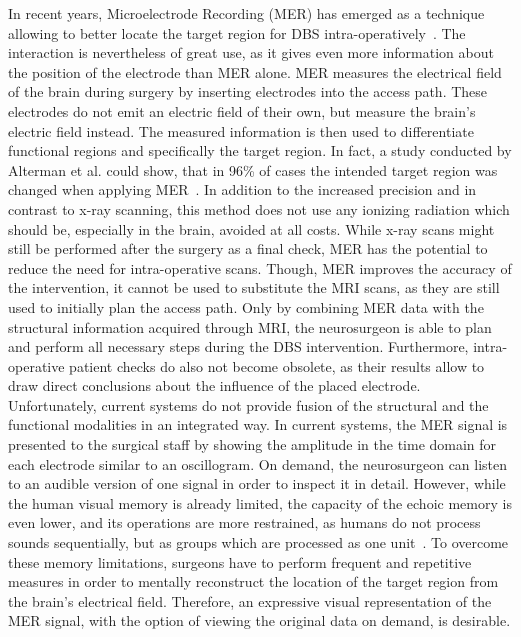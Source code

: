 \documentclass{vgtc}                          %
\begin{document}
In recent years, Microelectrode Recording (MER) has emerged as a technique allowing to better locate the target region for DBS intra-operatively~\cite{Lenz1988}. The interaction is nevertheless of great use, as it gives even more information about the position of the electrode than MER alone. MER measures the electrical field of the brain during surgery by inserting electrodes into the access path. These electrodes do not emit an electric field of their own, but measure the brain's electric field instead. The measured information is then used to differentiate functional regions and specifically the target region. In fact, a study conducted by Alterman et al. could show, that in 96\% of cases the intended target region was changed when applying MER~\cite{Alterman1999}. In addition to the increased precision and in contrast to x-ray scanning, this method does not use any ionizing radiation which should be, especially in the brain, avoided at all costs. While x-ray scans might still be performed after the surgery as a final check, MER has the potential to reduce the need for intra-operative scans. Though, MER improves the accuracy of the intervention, it cannot be used to substitute the MRI scans, as they are still used to initially plan the access path. Only by combining MER data with the structural information acquired through MRI, the neurosurgeon is able to plan and perform all necessary steps during the DBS intervention. Furthermore, intra-operative patient checks do also not become obsolete, as their results allow to draw direct conclusions about the influence of the placed electrode. Unfortunately, current systems do not provide fusion of the structural and the functional modalities in an integrated way. In current systems, the MER signal is presented to the surgical staff by showing the amplitude in the time domain for each electrode similar to an oscillogram. On demand, the neurosurgeon can listen to an audible version of one signal in order to inspect it in detail. However, while the human visual memory is already limited, the capacity of the echoic memory is even lower, and its operations are more restrained, as humans do not process sounds sequentially, but as groups which are processed as one unit~\cite{Radvansky2005}. To overcome these memory limitations, surgeons have to perform frequent and repetitive measures in order to mentally reconstruct the location of the target region from the brain's electrical field. Therefore, an expressive visual representation of the MER signal, with the option of viewing the original data on demand, is desirable.
\end{document}
